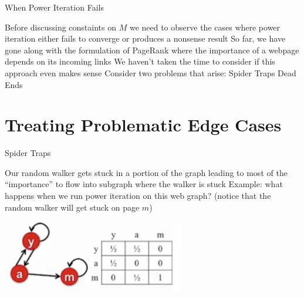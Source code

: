 \documentclass{beamer}
\begin{document}
\begin{frame}[t]{When Power Iteration Fails}
    \begin{outline}
        \1 Before discussing constaints on $M$ we need to observe the cases where power iteration either fails to converge or produces a nonsense result
        \1 So far, we have gone along with the formulation of PageRank where the importance of a webpage depends on its incoming links
        \1 We haven't taken the time to consider if this approach even makes sense
        \1 Consider two problems that arise:
            \2 Spider Traps
            \2 Dead Ends
    \end{outline}
\end{frame}
\section{Treating Problematic Edge Cases}
\begin{frame}[t]{Spider Traps}
\begin{outline}
    \1 Our random walker gets stuck in a portion of the graph leading to most of the “importance” to flow into subgraph where the walker is stuck
    \1 Example: what happens when we run power iteration on this web graph? (notice that the random walker will get stuck on page $m$)
    \begin{center}
        \includegraphics[width=0.6\textwidth]{spider.png}
    \end{center}
\end{outline}
\end{frame}
\end{document}
